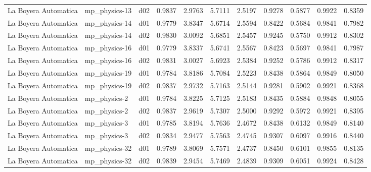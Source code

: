 \begin{longtable}{lllrrrrrrrr}
 La Boyera Automatica  &         mp\_physics-13 &     d02 &   0.9837 &   2.9763 &   5.7111 &       2.5197 &        0.9278 &       0.5877 &           0.9922 &  0.8359 \\
 La Boyera Automatica  &         mp\_physics-14 &     d01 &   0.9779 &   3.8347 &   5.6714 &       2.5594 &        0.8422 &       0.5684 &           0.9841 &  0.7982 \\
 La Boyera Automatica  &         mp\_physics-14 &     d02 &   0.9830 &   3.0092 &   5.6851 &       2.5457 &        0.9245 &       0.5750 &           0.9912 &  0.8302 \\
 La Boyera Automatica  &         mp\_physics-16 &     d01 &   0.9779 &   3.8337 &   5.6741 &       2.5567 &        0.8423 &       0.5697 &           0.9841 &  0.7987 \\
 La Boyera Automatica  &         mp\_physics-16 &     d02 &   0.9831 &   3.0027 &   5.6923 &       2.5384 &        0.9252 &       0.5786 &           0.9912 &  0.8317 \\
 La Boyera Automatica  &         mp\_physics-19 &     d01 &   0.9784 &   3.8186 &   5.7084 &       2.5223 &        0.8438 &       0.5864 &           0.9849 &  0.8050 \\
 La Boyera Automatica  &         mp\_physics-19 &     d02 &   0.9837 &   2.9732 &   5.7163 &       2.5144 &        0.9281 &       0.5902 &           0.9921 &  0.8368 \\
 La Boyera Automatica  &          mp\_physics-2 &     d01 &   0.9784 &   3.8225 &   5.7125 &       2.5183 &        0.8435 &       0.5884 &           0.9848 &  0.8055 \\
 La Boyera Automatica  &          mp\_physics-2 &     d02 &   0.9837 &   2.9619 &   5.7307 &       2.5000 &        0.9292 &       0.5972 &           0.9921 &  0.8395 \\
 La Boyera Automatica  &          mp\_physics-3 &     d01 &   0.9785 &   3.8194 &   5.7636 &       2.4672 &        0.8438 &       0.6132 &           0.9849 &  0.8140 \\
 La Boyera Automatica  &          mp\_physics-3 &     d02 &   0.9834 &   2.9477 &   5.7563 &       2.4745 &        0.9307 &       0.6097 &           0.9916 &  0.8440 \\
 La Boyera Automatica  &         mp\_physics-32 &     d01 &   0.9789 &   3.8069 &   5.7571 &       2.4737 &        0.8450 &       0.6101 &           0.9855 &  0.8135 \\
 La Boyera Automatica  &         mp\_physics-32 &     d02 &   0.9839 &   2.9454 &   5.7469 &       2.4839 &        0.9309 &       0.6051 &           0.9924 &  0.8428 \\

\end{longtable}
